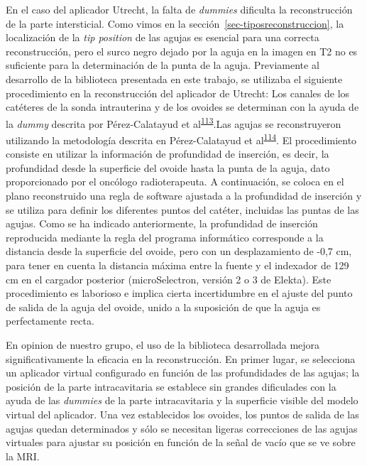 \documentclass[
  a4paper,
]{scrreprt}
\begin{document}
En el caso del aplicador Utrecht, la falta de \emph{dummies} dificulta
la reconstrucción de la parte intersticial. Como vimos en la
sección~\ref{sec-tiposreconstruccion}, la localización de la \emph{tip
position} de las agujas es esencial para una correcta reconstrucción,
pero el surco negro dejado por la aguja en la imagen en T2 no es
suficiente para la determinación de la punta de la aguja. Previamente al
desarrollo de la biblioteca presentada en este trabajo, se utilizaba el
siguiente procedimiento en la reconstrucción del aplicador de Utrecht:
Los canales de los catéteres de la sonda intrauterina y de los ovoides
se determinan con la ayuda de la \emph{dummy} descrita por
Pérez-Calatayud et
al\textsuperscript{\protect\hyperlink{ref-puxe9rez-calatayud2011}{113}}.Las
agujas se reconstruyeron utilizando la metodología descrita en
Pérez-Calatayud et
al\textsuperscript{\protect\hyperlink{ref-perez-calatayud2011}{114}}. El
procedimiento consiste en utilizar la información de profundidad de
inserción, es decir, la profundidad desde la superficie del ovoide hasta
la punta de la aguja, dato proporcionado por el oncólogo radioterapeuta.
A continuación, se coloca en el plano reconstruido una regla de software
ajustada a la profundidad de inserción y se utiliza para definir los
diferentes puntos del catéter, incluidas las puntas de las agujas. Como
se ha indicado anteriormente, la profundidad de inserción reproducida
mediante la regla del programa informático corresponde a la distancia
desde la superficie del ovoide, pero con un desplazamiento de -0,7 cm,
para tener en cuenta la distancia máxima entre la fuente y el indexador
de 129 cm en el cargador posterior (microSelectron, versión 2 o 3 de
Elekta). Este procedimiento es laborioso e implica cierta incertidumbre
en el ajuste del punto de salida de la aguja del ovoide, unido a la
suposición de que la aguja es perfectamente recta.

En opinion de nuestro grupo, el uso de la biblioteca desarrollada mejora
significativamente la eficacia en la reconstrucción. En primer lugar, se
selecciona un aplicador virtual configurado en función de las
profundidades de las agujas; la posición de la parte intracavitaria se
establece sin grandes dificulades con la ayuda de las \emph{dummies} de
la parte intracavitaria y la superficie visible del modelo virtual del
aplicador. Una vez establecidos los ovoides, los puntos de salida de las
agujas quedan determinados y sólo se necesitan ligeras correcciones de
las agujas virtuales para ajustar su posición en función de la señal de
vacío que se ve sobre la MRI.
\end{document}

